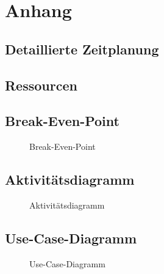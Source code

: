 \section{Anhang}
\subsection{Detaillierte Zeitplanung}
\label{app:Zeitplanung}
\clearpage

\subsection{Ressourcen}
\label{app:Ressourcen}

\clearpage

\subsection{Break-Even-Point}
\label{app:BreakEvenPoint}
\begin{figure}[!htb]
    \centering
    \caption{Break-Even-Point}
\end{figure}


\clearpage

\subsection{Aktivitätsdiagramm}
\label{app:Aktivitaet}
\begin{figure}[!htb]
    \centering
    \caption{Aktivitätsdiagramm}
\end{figure}
\clearpage

\subsection{Use-Case-Diagramm}
\label{app:UseCase}
\begin{figure}[!htb]
    \centering
    \caption{Use-Case-Diagramm}
\end{figure}
\clearpage
\thispagestyle{empty}

\clearpage
\setcounter{subsection}{7}

\clearpage

